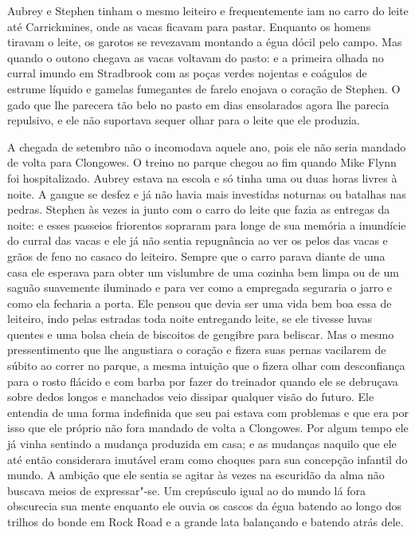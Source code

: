 Aubrey e Stephen tinham o mesmo leiteiro e frequentemente iam no carro
do leite até Carrickmines, onde as vacas ficavam para pastar. Enquanto
os homens tiravam o leite, os garotos se revezavam montando a égua
dócil pelo campo. Mas quando o outono chegava as vacas voltavam do
pasto: e a primeira olhada no curral imundo em Stradbrook com as poças
verdes nojentas e coágulos de estrume líquido e gamelas fumegantes de
farelo enojava o coração de Stephen. O gado que lhe parecera tão belo
no pasto em dias ensolarados agora lhe parecia repulsivo, e ele não
suportava sequer olhar para o leite que ele produzia.

A chegada de setembro não o incomodava aquele ano, pois ele não seria
mandado de volta para Clongowes. O treino no parque chegou ao fim
quando Mike Flynn foi hospitalizado. Aubrey estava na escola e só tinha
uma ou duas horas livres à noite. A gangue se desfez e já não havia
mais investidas noturnas ou batalhas nas pedras. Stephen às vezes ia
junto com o carro do leite que fazia as entregas da noite: e esses
passeios friorentos sopraram para longe de sua memória a imundície do
curral das vacas e ele já não sentia repugnância ao ver os pelos das
vacas e grãos de feno no casaco do leiteiro. Sempre que o carro parava
diante de uma casa ele esperava para obter um vislumbre de uma cozinha
bem limpa ou de um saguão suavemente iluminado e para ver como a
empregada seguraria o jarro e como ela fecharia a porta. Ele pensou que
devia ser uma vida bem boa essa de leiteiro, indo pelas estradas toda
noite entregando leite, se ele tivesse luvas quentes e uma bolsa cheia
de biscoitos de gengibre para beliscar. Mas o mesmo pressentimento que
lhe angustiara o coração e fizera suas pernas vacilarem de súbito ao
correr no parque, a mesma intuição que o fizera olhar com desconfiança
para o rosto flácido e com barba por fazer do treinador quando ele se
debruçava sobre dedos longos e manchados veio dissipar qualquer visão
do futuro. Ele entendia de uma forma indefinida que seu pai estava com
problemas e que era por isso que ele próprio não fora mandado de
volta a Clongowes. Por algum tempo ele já vinha sentindo a mudança
produzida em casa; e as mudanças naquilo que ele até então considerara
imutável eram como choques para sua concepção infantil do mundo. A
ambição que ele sentia se agitar às vezes na escuridão da alma não
buscava meios de expressar"-se. Um crepúsculo igual ao do mundo lá fora
obscurecia sua mente enquanto ele ouvia os cascos da égua batendo ao
longo dos trilhos do bonde em Rock Road e a grande lata balançando e
batendo atrás dele.

